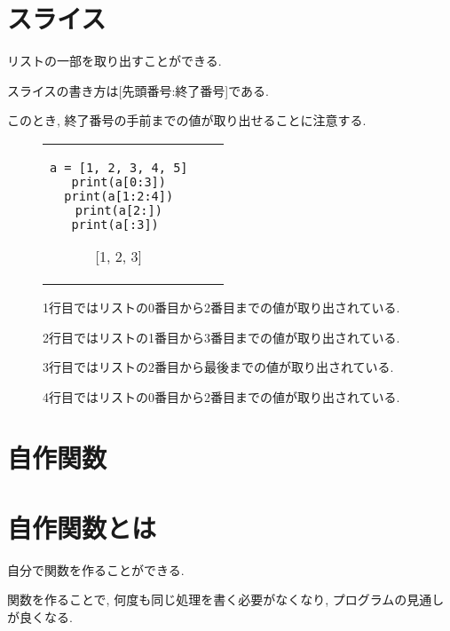 \documentclass[dvipdfmx]{jsbook}
\newcommand{\countup}[1]{\setcounter{chapter}{#1} \setcounter{section}{0}}
\newcommand{\info}[2]{\begin{tcolorbox}[colframe=gray, colback=black!10!white, coltitle=white, fonttitle=\bfseries, title={#1}]
{#2}\end{tcolorbox}}
\begin{document}
\newpage

\section{スライス}
リストの一部を取り出すことができる. \par
スライスの書き方は[先頭番号:終了番号]である. \par
このとき, 終了番号の手前までの値が取り出せることに注意する. \par
\begin{figure}[htp]
	\begin{tabular}{ccc}
		\begin{minipage}[ht]{.3\textwidth}
			\begin{lstlisting}[caption=スライス]
a = [1, 2, 3, 4, 5]
print(a[0:3])
print(a[1:2:4])
print(a[2:])
print(a[:3]) \end{lstlisting}
		\end{minipage} \hspace{3truemm}
		\begin{minipage}[ht]{.15\textwidth}
			\info{出力}{[1, 2, 3] \par [2, 3, 4] \par [3, 4, 5] \par [1, 2, 3]}
		\end{minipage}
	\end{tabular}
	\info{説明}{1行目ではリストの0番目から2番目までの値が取り出されている. \par
		2行目ではリストの1番目から3番目までの値が取り出されている. \par
		3行目ではリストの2番目から最後までの値が取り出されている. \par
		4行目ではリストの0番目から2番目までの値が取り出されている.}
\end{figure}

\section*{自作関数}
\countup{8}
\section{自作関数とは}
自分で関数を作ることができる. \par
関数を作ることで, 何度も同じ処理を書く必要がなくなり, プログラムの見通しが良くなる. \par
\end{document}
